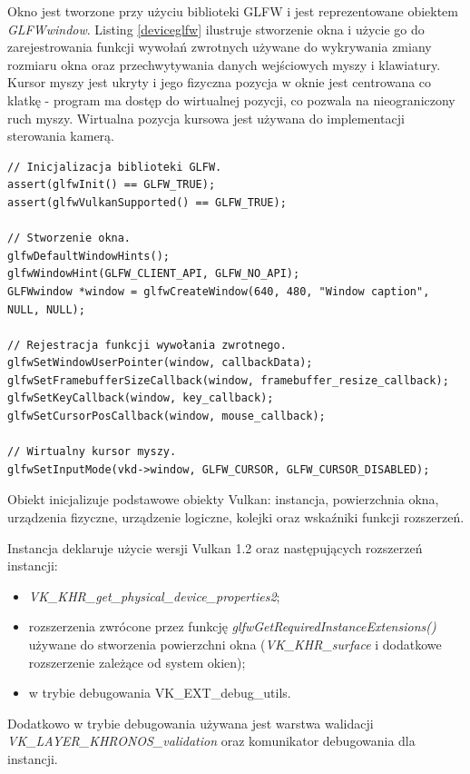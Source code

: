 Okno jest tworzone przy użyciu biblioteki GLFW i jest reprezentowane obiektem \textit{GLFWwindow}.
Listing \ref{deviceglfw} ilustruje stworzenie okna i użycie go do zarejestrowania funkcji wywołań zwrotnych używane do wykrywania zmiany rozmiaru okna oraz przechwytywania danych wejściowych myszy i klawiatury.
Kursor myszy jest ukryty i jego fizyczna pozycja w oknie jest
centrowana co klatkę - program ma dostęp do wirtualnej pozycji, co pozwala na nieograniczony ruch myszy.
Wirtualna pozycja kursowa jest używana do implementacji sterowania kamerą.
\lstset{language=C}
\begin{lstlisting}[caption={Użycie biblioteki GLFW do stworzenia okna i rejestracji funkcji wywołań zwrotnich},captionpos=b,label={deviceglfw}]
// Inicjalizacja biblioteki GLFW.
assert(glfwInit() == GLFW_TRUE);
assert(glfwVulkanSupported() == GLFW_TRUE);

// Stworzenie okna.
glfwDefaultWindowHints();
glfwWindowHint(GLFW_CLIENT_API, GLFW_NO_API);
GLFWwindow *window = glfwCreateWindow(640, 480, "Window caption", NULL, NULL);

// Rejestracja funkcji wywołania zwrotnego.
glfwSetWindowUserPointer(window, callbackData);
glfwSetFramebufferSizeCallback(window, framebuffer_resize_callback);
glfwSetKeyCallback(window, key_callback);
glfwSetCursorPosCallback(window, mouse_callback);

// Wirtualny kursor myszy.
glfwSetInputMode(vkd->window, GLFW_CURSOR, GLFW_CURSOR_DISABLED);
\end{lstlisting}

Obiekt inicjalizuje podstawowe obiekty Vulkan: instancja, powierzchnia okna, urządzenia fizyczne, urządzenie logiczne, kolejki oraz wskaźniki funkcji rozszerzeń.

Instancja deklaruje użycie wersji Vulkan 1.2 oraz następujących rozszerzeń instancji:
\begin{itemize}
	\item \textit{VK\_KHR\_get\_physical\_device\_properties2};
	\item rozszerzenia zwrócone przez funkcję \textit{glfwGetRequiredInstanceExtensions()} używane do stworzenia powierzchni okna (\textit{VK\_KHR\_surface} i dodatkowe rozszerzenie zależące od system okien);
	\item w trybie debugowania VK\_EXT\_debug\_utils.
\end{itemize}
Dodatkowo w trybie debugowania używana jest warstwa walidacji \textit{VK\_LAYER\_KHRONOS\_validation} oraz komunikator debugowania dla instancji.

